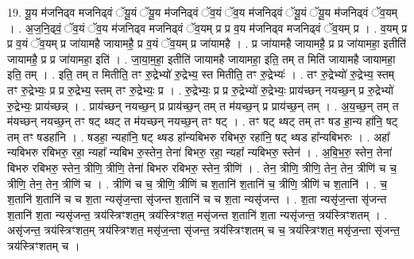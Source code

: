 \documentclass[17pt]{extarticle}
\begin{document}
19. यू॒य म॑जनिढ्व मजनिढ्वं ॅयू॒यं ॅयू॒य म॑जनिढ्वं ॅव॒यं ॅव॒य म॑जनिढ्वं ॅयू॒यं ॅयू॒य म॑जनिढ्वं ॅव॒यम् । . अ॒ज॒नि॒ढ्वं॒ ॅव॒यं ॅव॒य म॑जनिढ्व मजनिढ्वं ॅव॒यम् प्र प्र व॒य म॑जनिढ्व मजनिढ्वं ॅव॒यम् प्र । . व॒यम् प्र प्र व॒यं ॅव॒यम् प्र जा॑यामहै जायामहै॒ प्र व॒यं ॅव॒यम् प्र जा॑यामहै । . प्र जा॑यामहै जायामहै॒ प्र प्र जा॑यामहा॒ इतीति॑ जायामहै॒ प्र प्र जा॑यामहा॒ इति॑ । . जा॒या॒म॒हा॒ इतीति॑ जायामहै जायामहा॒ इति॒ तम् त मिति॑ जायामहै जायामहा॒ इति॒ तम् । . इति॒ तम् त मितीति॒ तꣳ रु॒द्रेभ्यो॑ रु॒द्रेभ्य॒ स्त मितीति॒ तꣳ रु॒द्रेभ्यः॑ । . तꣳ रु॒द्रेभ्यो॑ रु॒द्रेभ्य॒ स्तम् तꣳ रु॒द्रेभ्यः॒ प्र प्र रु॒द्रेभ्य॒ स्तम् तꣳ रु॒द्रेभ्यः॒ प्र । . रु॒द्रेभ्यः॒ प्र प्र रु॒द्रेभ्यो॑ रु॒द्रेभ्यः॒ प्राय॑च्छन् नयच्छ॒न् प्र रु॒द्रेभ्यो॑ रु॒द्रेभ्यः॒ प्राय॑च्छन्न् । . प्राय॑च्छन् नयच्छ॒न् प्र प्राय॑च्छ॒न् तम् त म॑यच्छ॒न् प्र प्राय॑च्छ॒न् तम् । . अ॒य॒च्छ॒न् तम् त म॑यच्छन् नयच्छ॒न् तꣳ षट् थ्षट् त म॑यच्छन् नयच्छ॒न् तꣳ षट् । . तꣳ षट् थ्षट् तम् तꣳ षड हा॒न्य हा॑नि॒ षट् तम् तꣳ षडहा॑नि । . षडहा॒ न्यहा॑नि॒ षट् थ्षड हा᳚न्यबिभरु रबिभरु॒ रहा॑नि॒ षट् थ्षड हा᳚न्यबिभरुः । . अहा᳚ न्यबिभरु रबिभरु॒ रहा॒ न्यहा᳚ न्यबिभ रु॒स्तेन॒ तेना॑ बिभरु॒ रहा॒ न्यहा᳚ न्यबिभरु॒ स्तेन॑ । . अ॒बि॒भ॒रु॒ स्तेन॒ तेना॑ बिभरु रबिभरु॒ स्तेन॒ त्रीणि॒ त्रीणि॒ तेना॑ बिभरु रबिभरु॒ स्तेन॒ त्रीणि॑ । . तेन॒ त्रीणि॒ त्रीणि॒ तेन॒ तेन॒ त्रीणि॑ च च॒ त्रीणि॒ तेन॒ तेन॒ त्रीणि॑ च । . त्रीणि॑ च च॒ त्रीणि॒ त्रीणि॑ च श॒तानि॑ श॒तानि॑ च॒ त्रीणि॒ त्रीणि॑ च श॒तानि॑ । . च॒ श॒तानि॑ श॒तानि॑ च च श॒ता न्यसृ॑ज॒न्ता सृ॑जन्त श॒तानि॑ च च श॒ता न्यसृ॑जन्त । . श॒ता न्यसृ॑ज॒न्ता सृ॑जन्त श॒तानि॑ श॒ता न्यसृ॑जन्त॒ त्रय॑स्त्रिꣳशत॒म् त्रय॑स्त्रिꣳशत॒ मसृ॑जन्त श॒तानि॑ श॒ता न्यसृ॑जन्त॒ त्रय॑स्त्रिꣳशतम् । . असृ॑जन्त॒ त्रय॑स्त्रिꣳशत॒म् त्रय॑स्त्रिꣳशत॒ मसृ॑ज॒न्ता सृ॑जन्त॒ त्रय॑स्त्रिꣳशतम् च च॒ त्रय॑स्त्रिꣳशत॒ मसृ॑ज॒न्ता सृ॑जन्त॒ त्रय॑स्त्रिꣳशतम् च । \newline
\end{document}
